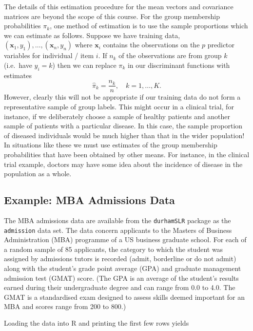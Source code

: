 \documentclass[
]{article}
\begin{document}
The details of this estimation procedure for the mean vectors and
covariance matrices are beyond the scope of this course. For the group
membership probabilities \(\pi_k\), one method of estimation is to use
the sample proportions which we can estimate as follows. Suppose we have
training data,
\((\boldsymbol{x}_1, y_1),\ldots,(\boldsymbol{x}_n, y_n)\) where
\(\boldsymbol{x}_i\) contains the observations on the \(p\) predictor
variables for individual / item \(i\). If \(n_k\) of the observations
are from group \(k\) (i.e.~have \(y_i=k\)) then we can replace \(\pi_k\)
in our discriminant functions with estimates \begin{equation*}
\hat{\pi}_k = \frac{n_k}{n}, \quad k=1,\ldots,K.
\end{equation*} However, clearly this will not be appropriate if our
training data do not form a representative sample of group labels. This
might occur in a clinical trial, for instance, if we deliberately choose
a sample of healthy patients and another sample of patients with a
particular disease. In this case, the sample proportion of diseased
individuals would be much higher than that in the wider population! In
situations like these we must use estimates of the group membership
probabilities that have been obtained by other means. For instance, in
the clinical trial example, doctors may have some idea about the
incidence of disease in the population as a whole.

\hypertarget{subsec:mbaadmissions}{%
\subsection{Example: MBA Admissions Data}\label{subsec:mbaadmissions}}

The MBA admissions data are available from the \texttt{durhamSLR}
package as the \texttt{admission} data set. The data concern applicants
to the Masters of Business Administration (MBA) programme of a US
business graduate school. For each of a random sample of 85 applicants,
the category to which the student was assigned by admissions tutors is
recorded (admit, borderline or do not admit) along with the student's
grade point average (GPA) and graduate management admission test (GMAT)
score. (The GPA is an average of the student's results earned during
their undergraduate degree and can range from 0.0 to 4.0. The GMAT is a
standardised exam designed to assess skills deemed important for an MBA
and scores range from 200 to 800.)

Loading the data into R and printing the first few rows yields
\end{document}
